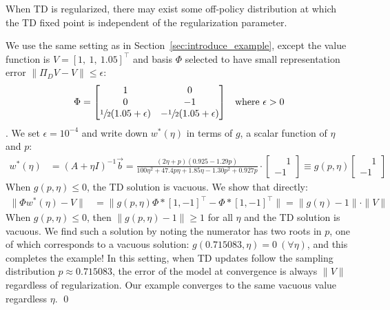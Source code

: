 \begin{example}
  \label{ex:withrr2}
  When TD is regularized, there may exist some off-policy distribution at which the TD fixed point is independent of the regularization parameter.

  \proof We use the same setting as in Section~\ref{sec:introduce_example}, except the value function is $V = [1,~1,~1.05]^\top$ and basis $\Phi$ selected to have small representation error $\|\Pi_D V - V\| \leq \epsilon$:
  \begin{align}
    \Phi & = \begin{bmatrix}
               1                              & 0                               \\
               0                              & -1                              \\
               \sfrac{1}{2} (1.05 + \epsilon) & -\sfrac{1}{2} (1.05 + \epsilon) \\
             \end{bmatrix} & \text{where $\epsilon > 0$}
  \end{align}.
  We set $\epsilon = 10^{-4}$ and write down $w^*(\eta)$ in terms of $g$, a scalar function of $\eta$ and $p$:
  \begin{align}
    w^*(\eta) & = (A+\eta I)^{-1} \vec b =
    \frac{(2\eta + p)(0.925 - 1.29p)}{100\eta^2+47.4p\eta +1.85\eta - 1.30p^2 + 0.927p}
    \cdot \begin{bmatrix} \phantom{-}1 \\ -1 \end{bmatrix}
    \equiv g(p,\eta) \begin{bmatrix} \phantom{-}1 \\ -1 \end{bmatrix} \label{eqn:wstarrr2}
  \end{align}
  When $g(p,\eta) \leq 0$, the TD solution is vacuous. We show that directly:
  \begin{align}
    \|\Phi w^*(\eta) - V\| & =
    \|g(p,\eta) \Phi*[1, -1]^\top - \Phi*[1, -1]^\top\|
    = \|g(\eta) - 1\|\cdot\|V\|
  \end{align}
  When $g(p,\eta) \leq 0$, then $\|g(p,\eta) - 1\| \geq 1$ for all $\eta$ and the TD solution is vacuous. We find such a solution by noting the numerator has two roots in $p$, one of which corresponds to a vacuous solution:
  $g(0.715083, \eta) = 0~(\forall \eta)$, and this completes the example! In this setting, when TD updates follow the sampling distribution $p\approx0.715083$, the error of the model at convergence is always $\|V\|$ regardless of regularization. Our example converges to the same vacuous value regardless $\eta$. \qed
\end{example}

